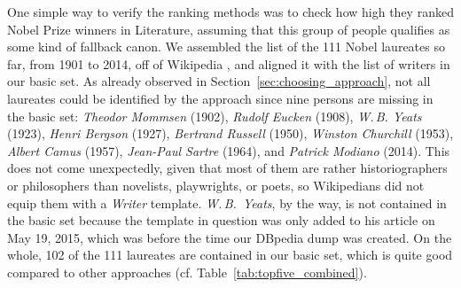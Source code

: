 \documentclass[a4paper,12pt]{scrartcl}
\begin{document}
One simple way to verify the ranking methods was to check how high
they ranked Nobel Prize winners in Literature, assuming that this
group of people qualifies as some kind of fallback canon.
%
%
We assembled the list of the 111 Nobel laureates so far, from 1901 to
2014, off of
Wikipedia \cite{wp:nobel}, %
and aligned it with the list of writers in our basic set.
%
As already observed in Section~\ref{sec:choosing_approach}, not all
laureates could be identified by the approach since nine persons are
missing in the basic set:
%
\emph{Theodor Mommsen} (1902), 
\emph{Rudolf Eucken} (1908), 
\emph{W.\,B. Yeats} (1923), 
\emph{Henri Bergson} (1927), 
\emph{Bertrand Russell} (1950), 
\emph{Winston Churchill} (1953), 
\emph{Albert Camus} (1957),
\emph{Jean-Paul Sartre} (1964), and 
\emph{Patrick Modiano} (2014).
%
%
This does not come unexpectedly, given that most of them are rather
historiographers or philosophers than novelists, playwrights, or
poets, so Wikipedians did not equip them with a \emph{Writer}
template.  \emph{W.\,B.~Yeats}, by the way, is not contained in the
basic set because the template in question was only added to his
article on May 19, 2015, which was before the time our DBpedia dump
was created.  On the whole, 102 of the 111 laureates are contained in
our basic set, which is quite good compared to other approaches
(cf. Table~\ref{tab:topfive_combined}).
\end{document}
